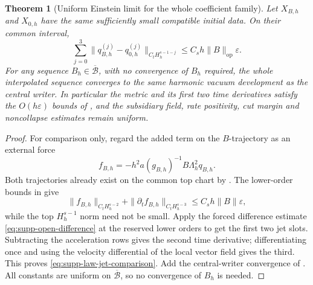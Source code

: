 \documentclass[11pt]{article}
\newtheorem{theorem}{Theorem}[section]
\theoremstyle{definition}
\theoremstyle{remark}
\newcommand{\op}{\mathrm{op}}
\begin{document}
\begin{theorem}[Uniform Einstein limit for the whole coefficient family]
\label{thm:supp-law-einstein}
Let $X_{B,h}$ and $X_{0,h}$ have the same sufficiently small compatible
initial data.  On their common interval,
\begin{equation}
 \boxed{\sum_{j=0}^3
 \|q_{B,h}^{(j)}-q_{0,h}^{(j)}\|_{C_tH_h^{s-1-j}}
       \le C_sh\|B\|_{\op}\varepsilon.}
 \label{eq:supp-law-jet-comparison}
\end{equation}
For any sequence $B_h\in\overline{\mathcal B}$, with no convergence of $B_h$
required, the whole interpolated sequence converges to the same harmonic
vacuum development as the central writer.  In particular the metric and its
first two time derivatives satisfy the $O(h\varepsilon)$ bounds of
, and the subsidiary field, rate positivity,
cut margin and noncollapse estimates remain uniform.
\end{theorem}
\begin{proof}
For comparison only, regard the added term on the $B$-trajectory as an
external force
\[
 f_{B,h}=-h^2a(g_{B,h})^{-1}B\Lambda_h^2q_{B,h}.
\]
Both trajectories already exist on the common top chart by
.  The lower-order bounds in
 give
\[
 \|f_{B,h}\|_{C_tH_h^{s-2}}
 +\|\partial_tf_{B,h}\|_{C_tH_h^{s-3}}
 \le C_sh\|B\|\varepsilon,
\]
while the top $H_h^{s-1}$ norm need not be small.  Apply the forced difference
estimate \eqref{eq:supp-open-difference} at the reserved lower orders to get
the first two jet slots.  Subtracting the acceleration rows gives the second
time derivative; differentiating once and using the velocity differential of
the local vector field gives the third.  This proves
\eqref{eq:supp-law-jet-comparison}.  Add the central-writer convergence of
.  All constants are uniform on
$\overline{\mathcal B}$, so no convergence of $B_h$ is needed.
\end{proof}
\end{document}

